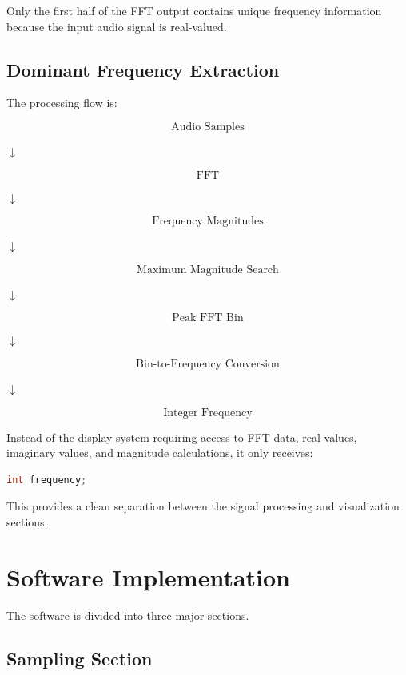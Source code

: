 \documentclass{article}
\begin{document}
\begin{center}
Only the first half of the FFT output contains unique frequency information because the input audio signal is real-valued.

\subsection{Dominant Frequency Extraction}

The processing flow is:

\begin{center}

\[
\boxed{\text{Audio Samples}}
\]

$\downarrow$

\[
\boxed{\text{FFT}}
\]

$\downarrow$

\[
\boxed{\text{Frequency Magnitudes}}
\]

$\downarrow$

\[
\boxed{\text{Maximum Magnitude Search}}
\]

$\downarrow$

\[
\boxed{\text{Peak FFT Bin}}
\]

$\downarrow$

\[
\boxed{\text{Bin-to-Frequency Conversion}}
\]

$\downarrow$

\[
\boxed{\text{Integer Frequency}}
\]

\end{center}

Instead of the display system requiring access to FFT data, real values, imaginary values, and magnitude calculations, it only receives:

\begin{lstlisting}[language=C++]
int frequency;
\end{lstlisting}

This provides a clean separation between the signal processing and visualization sections.

\newpage


\section{Software Implementation}

The software is divided into three major sections.

\subsection{Sampling Section}


\end{center}
\end{document}
